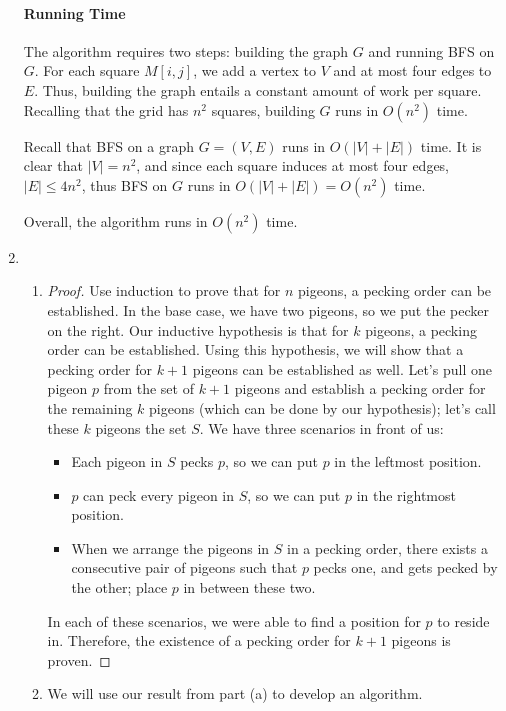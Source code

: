 \documentclass{article}
\begin{document}
\begin{enumerate}
\paragraph{Running Time}
The algorithm requires two steps: building the graph $G$ and running BFS on $G$. For each square $M[i, j]$, we add a vertex to $V$ and at most four edges to $E$. Thus, building the graph entails a constant amount of work per square. Recalling that the grid has $n^2$ squares, building $G$ runs in $O(n^2)$ time.

Recall that BFS on a graph $G = (V, E)$ runs in $O(|V| + |E|)$ time. It is clear that $|V| = n^2$, and since each square induces at most four edges, $|E| \leq 4n^2$, thus BFS on $G$ runs in $O(|V| + |E|) = O(n^2)$ time.

Overall, the algorithm runs in $O(n^2)$ time.

%
%
\item
\begin{enumerate}
\item
\begin{proof}
Use induction to prove that for $n$ pigeons, a pecking order can be established. In the base case, we have two pigeons, so we put the pecker on the right. Our inductive hypothesis is that for $k$ pigeons, a pecking order can be established. Using this hypothesis, we will show that a pecking order for $k + 1$ pigeons can be established as well. Let's pull one pigeon $p$ from the set of $k + 1$ pigeons and establish a pecking order for the remaining $k$ pigeons (which can be done by our hypothesis); let's call these $k$ pigeons the set $S$. We have three scenarios in front of us:
\begin{itemize}
\item Each pigeon in $S$ pecks $p$, so we can put $p$ in the leftmost position.
\item $p$ can peck every pigeon in $S$, so we can put $p$ in the rightmost position.
\item When we arrange the pigeons in $S$ in a pecking order, there exists a consecutive pair of pigeons such that $p$ pecks one, and gets pecked by the other; place $p$ in between these two.
\end{itemize}
In each of these scenarios, we were able to find a position for $p$ to reside in. Therefore, the existence of a pecking order for $k + 1$ pigeons is proven.
\end{proof}

\item We will use our result from part (a) to develop an algorithm.

\end{enumerate}
\end{enumerate}
\end{document}
